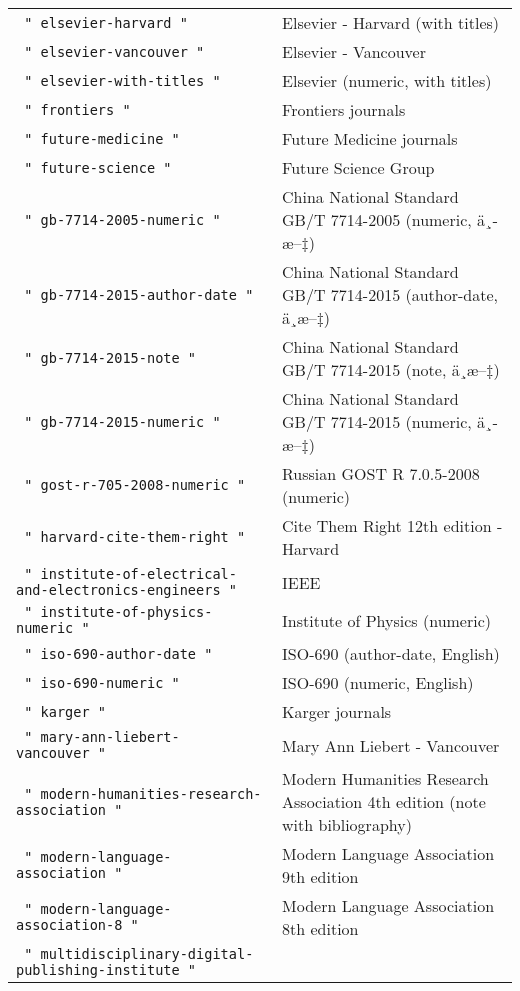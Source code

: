 \begin{longtable}[]{@{}ll@{}}
\texttt{\ "\ elsevier-harvard\ "\ } & Elsevier - Harvard (with
titles) \\
\texttt{\ "\ elsevier-vancouver\ "\ } & Elsevier - Vancouver \\
\texttt{\ "\ elsevier-with-titles\ "\ } & Elsevier (numeric, with
titles) \\
\texttt{\ "\ frontiers\ "\ } & Frontiers journals \\
\texttt{\ "\ future-medicine\ "\ } & Future Medicine journals \\
\texttt{\ "\ future-science\ "\ } & Future Science Group \\
\texttt{\ "\ gb-7714-2005-numeric\ "\ } & China National Standard GB/T
7714-2005 (numeric, ä¸­æ--‡) \\
\texttt{\ "\ gb-7714-2015-author-date\ "\ } & China National Standard
GB/T 7714-2015 (author-date, ä¸­æ--‡) \\
\texttt{\ "\ gb-7714-2015-note\ "\ } & China National Standard GB/T
7714-2015 (note, ä¸­æ--‡) \\
\texttt{\ "\ gb-7714-2015-numeric\ "\ } & China National Standard GB/T
7714-2015 (numeric, ä¸­æ--‡) \\
\texttt{\ "\ gost-r-705-2008-numeric\ "\ } & Russian GOST R 7.0.5-2008
(numeric) \\
\texttt{\ "\ harvard-cite-them-right\ "\ } & Cite Them Right 12th
edition - Harvard \\
\texttt{\ "\ institute-of-electrical-and-electronics-engineers\ "\ } &
IEEE \\
\texttt{\ "\ institute-of-physics-numeric\ "\ } & Institute of Physics
(numeric) \\
\texttt{\ "\ iso-690-author-date\ "\ } & ISO-690 (author-date,
English) \\
\texttt{\ "\ iso-690-numeric\ "\ } & ISO-690 (numeric, English) \\
\texttt{\ "\ karger\ "\ } & Karger journals \\
\texttt{\ "\ mary-ann-liebert-vancouver\ "\ } & Mary Ann Liebert -
Vancouver \\
\texttt{\ "\ modern-humanities-research-association\ "\ } & Modern
Humanities Research Association 4th edition (note with bibliography) \\
\texttt{\ "\ modern-language-association\ "\ } & Modern Language
Association 9th edition \\
\texttt{\ "\ modern-language-association-8\ "\ } & Modern Language
Association 8th edition \\
\texttt{\ "\ multidisciplinary-digital-publishing-institute\ "\ } &

\end{longtable}
